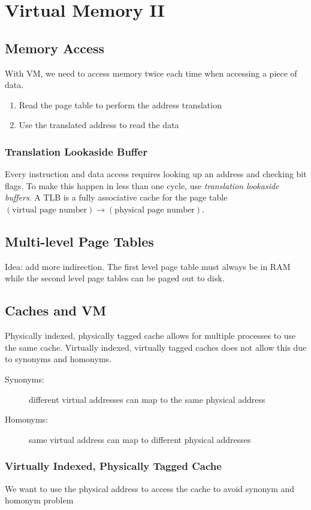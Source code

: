 \chapter{Virtual Memory II}

\section{Memory Access}
With VM, we need to access memory twice each time when accessing a piece of data.
\begin{enumerate}
    \item Read the page table to perform the address translation
    \item Use the translated address to read the data
\end{enumerate}

\subsection{Translation Lookaside Buffer}
Every instruction and data access requires looking up an address and checking bit flags. To make this happen in less than one cycle, use \emph{translation lookaside buffers}. A TLB is a fully associative cache for the page table \((\text{virtual page number})\to(\text{physical page number})\).

\section{Multi-level Page Tables}
Idea: add more indirection. The first level page table must always be in RAM while the second level page tables can be paged out to disk.

\section{Caches and VM}

Physically indexed, physically tagged cache allows for multiple processes to use the same cache. Virtually indexed, virtually tagged caches does not allow this due to synonyms and homonyms.

\begin{description}
    \item[Synonyms:] different virtual addresses can map to the same physical address
    \item[Homonyms:] same virtual address can map to different physical addresses
\end{description}

\subsection{Virtually Indexed, Physically Tagged Cache}
We want to use the physical address to access the cache to avoid synonym and homonym problem